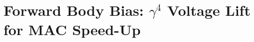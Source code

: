 %
%

\providecommand{\vdd}{V_{\mathrm{DD}}}
\providecommand{\vfbb}{V_{\mathrm{FBB}}}
\providecommand{\vfbbmax}{V_{\mathrm{FBB,MAX}}}
\providecommand{\gammabody}{\gamma_{\mathrm{body}}}
\providecommand{\gamfour}{\gamma^{4}}
\providecommand{\phiinv}{\varphi^{-1}}
\providecommand{\phiinvtwelve}{\varphi^{-12}}
\providecommand{\opfbb}{\texttt{0xEE}~OP\_FBB}
\providecommand{\tMAC}{t_{\mathrm{MAC}}}
\providecommand{\DtMAC}{\Delta t_{\mathrm{MAC}}}
\providecommand{\TOPS}{\mathrm{TOPS/W}}
\providecommand{\Qonefifteen}{Q_{1.15}}
\providecommand{\coqfile}{\texttt{trios-coq/Physics/FBBActive.v}}
\providecommand{\anchorline}{%
  $\varphi^{2}+\varphi^{-2}=3$ \textperiodcentered{}
  $\gamma^{4}=\varphi^{-12}$ \textperiodcentered{}
  DOI \href{https://doi.org/10.5281/zenodo.19227877}{10.5281/zenodo.19227877}}

\chapter{Forward Body Bias: \texorpdfstring{$\gamma^{4}$}{gamma^4}
         Voltage Lift for MAC Speed-Up}
\label{ch:fbb-active}

